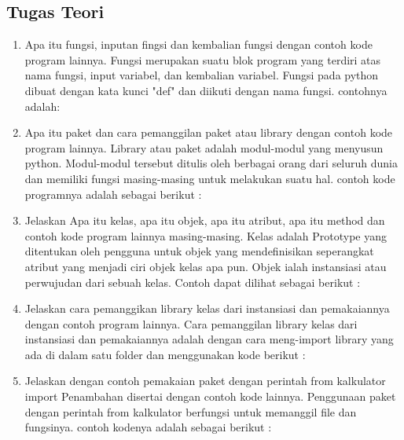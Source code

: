 \subsection{Tugas Teori}
\begin{enumerate}
	\item Apa itu fungsi, inputan fingsi dan kembalian fungsi dengan contoh kode program
	lainnya.\newline
	Fungsi merupakan suatu blok program yang terdiri atas nama fungsi, input variabel, dan kembalian variabel. 
	Fungsi pada python dibuat dengan kata kunci "def" dan diikuti dengan nama fungsi. contohnya adalah:
	
	
	\item Apa itu paket dan cara pemanggilan paket atau library dengan contoh kode program lainnya.\newline
	Library atau paket adalah modul-modul yang menyusun python. Modul-modul tersebut ditulis oleh berbagai orang dari seluruh dunia dan memiliki fungsi masing-masing untuk melakukan suatu hal. contoh kode programnya adalah sebagai berikut :
	
	
	\item Jelaskan Apa itu kelas, apa itu objek, apa itu atribut, apa itu method dan contoh kode program lainnya masing-masing.\newline
	Kelas adalah Prototype yang ditentukan oleh pengguna untuk objek yang mendefinisikan seperangkat atribut yang menjadi ciri objek kelas apa pun. Objek ialah instansiasi atau perwujudan dari sebuah kelas. Contoh dapat dilihat sebagai berikut :
	
	
	\item Jelaskan cara pemanggikan library kelas dari instansiasi dan pemakaiannya dengan contoh program lainnya.\newline
	Cara pemanggilan  library kelas dari instansiasi dan pemakaiannya adalah dengan cara meng-import library yang ada di dalam satu folder dan menggunakan kode berikut :
	
	
	\item Jelaskan dengan contoh pemakaian paket dengan perintah from kalkulator import Penambahan disertai dengan contoh kode lainnya.\newline
	Penggunaan paket dengan perintah from kalkulator berfungsi untuk memanggil file dan fungsinya. contoh kodenya adalah sebagai berikut :
	
	

\end{enumerate}
